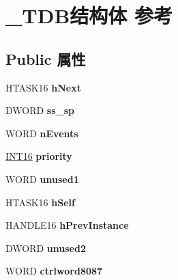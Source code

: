 \hypertarget{struct___t_d_b}{}\section{\+\_\+\+T\+D\+B结构体 参考}
\label{struct___t_d_b}
\subsection*{Public 属性}
\begin{DoxyCompactItemize}
\item 
\mbox{\label{struct___t_d_b_ae7509dcd56786f325345b052ec29dc82}} 
H\+T\+A\+S\+K16 {\bfseries h\+Next}
\item 
\mbox{\label{struct___t_d_b_af6d442f35701745ae6adffc930a0b2ce}} 
D\+W\+O\+RD {\bfseries ss\+\_\+sp}
\item 
\mbox{\label{struct___t_d_b_a6cfc948db32928df89db6613057f9f78}} 
W\+O\+RD {\bfseries n\+Events}
\item 
\mbox{\label{struct___t_d_b_a0de1856c7da4f1b930b7df66d32b9df0}} 
\hyperlink{_processor_bind_8h_a30f500129d8c688af07726d5d34ce52d}{I\+N\+T16} {\bfseries priority}
\item 
\mbox{\label{struct___t_d_b_a19d21182396d37722c2adf05b7314775}} 
W\+O\+RD {\bfseries unused1}
\item 
\mbox{\label{struct___t_d_b_a1b714bef016990ce16c69370a772a3f2}} 
H\+T\+A\+S\+K16 {\bfseries h\+Self}
\item 
\mbox{\label{struct___t_d_b_a8373153f0a3bfc0a4adaf53f11c6bcb3}} 
H\+A\+N\+D\+L\+E16 {\bfseries h\+Prev\+Instance}
\item 
\mbox{\label{struct___t_d_b_aaa8d8808e6394d4fd5a6f06ae82b7ab9}} 
D\+W\+O\+RD {\bfseries unused2}
\item 
\mbox{\label{struct___t_d_b_acb3e073b664c69f71e48f1ce7bcdbf89}} 
W\+O\+RD {\bfseries ctrlword8087}
\item 
\mbox{\label{struct___t_d_b_a49bddc8beca2218578ef184e8ee15906}} 

\end{DoxyCompactItemize}

